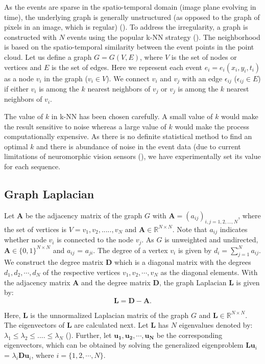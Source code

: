 \documentclass{article}
\begin{document}
As the events are sparse in the spatio-temporal domain (image plane evolving in time), the underlying graph is generally unstructured (as opposed to the graph of pixels in an image, which is regular) (\cite{zhou2020event}). To address the irregularity, a graph is constructed with $N$ events using the popular k-NN strategy (\cite{ortega2018graph}). The neighborhood is based on the spatio-temporal similarity between the event points in the point cloud. Let us define a graph $G = G(V,E)$, where  $V$ is the set of nodes or vertices and $E$ is the set of edges. Here we represent each event $e_i = e_i(x_i , y_i , t_i)$ as a node $v_i$ in the graph ($v_i \in V$). We connect $v_i$ and $v_j$ with an edge $\epsilon_{ij}$ ($\epsilon_{ij} \in E$) if either $v_i$ is among the $k$ nearest neighbors of $v_j$ or $v_j$ is among the $k$ nearest neighbors of $v_i$. 

The value of $k$ in k-NN has been chosen carefully. A small value of $k$ would make the result sensitive to noise whereas a large value of $k$ would make the process computationally expensive. As there is no definite statistical method to find an optimal $k$ and there is abundance of noise in the event data (due to current limitations of neuromorphic vision sensors (\cite{chen2018neuromorphic}), we have experimentally set its value for each sequence. 

\subsection{Graph Laplacian}
Let $\mathbf{A}$ be the adjacency matrix of the graph $G$ with $\mathbf{A} = (a_{ij})_{i,j = 1,2,...,N}$, where the set of vertices is $V = {v_1, v_2,.....,v_N}$ and $\mathbf{A} \in \mathbb{R}^{N \times N}$. Note that $a_{ij}$ indicates whether node $v_i$ is connected to the node $v_j$. As $G$ is unweighted and undirected, $\mathbf{A} \in \{0,1\}^{N \times N}$ and $a_{ij}$ = $a_{ji}$. The degree of a vertex $v_i$ is given by $d_i = \sum_{j=1}^{N} a_{ij}$. We construct the degree matrix $\mathbf{D}$ which is a diagonal matrix with the degrees $d_1, d_2, \cdots , d_N$ of the respective vertices $v_1, v_2, \cdots , v_N$ as the diagonal elements. With the adjacency matrix $\mathbf{A}$ and the degree matrix $\mathbf{D}$, the graph Laplacian $\mathbf{L}$ is given by: 
\begin{equation}
    \mathbf{L} = \mathbf{D} - \mathbf{A}.
    \label{eq: Laplacian}
\end{equation}

Here, $\mathbf{L}$ is the unnormalized Laplacian matrix of the graph $G$ and $\mathbf{L} \in \mathbb{R}^{N \times N}$. 
The eigenvectors of $\mathbf{L}$ are calculated next. Let $\mathbf{L}$ has $N$ eigenvalues denoted by: $\lambda_1 \leq \lambda_2 \leq....\leq \lambda_N$ (\cite{von2007tutorial}). Further, let $\mathbf{u_1}, \mathbf{u_2}, \cdots , \mathbf{u_N}$ be the corresponding eigenvectors, which can be obtained by solving the generalized eigenproblem $\mathbf{L} \mathbf{u}_i$ = $\lambda_i \mathbf{D} \mathbf{u}_i$, where $i = \{1, 2, \cdots, N\}$. 
\end{document}
